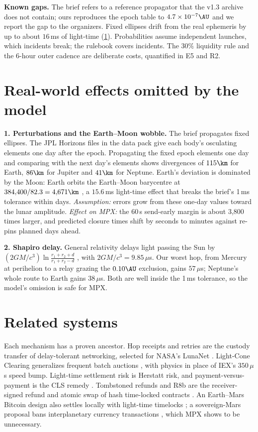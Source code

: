 \textbf{Known gaps.} The brief refers to a reference propagator that the v1.3 archive does not contain; ours reproduces the epoch table to $4.7\times10^{-7}\AU$ and we report the gap to the organizers. Fixed ellipses drift from the real ephemeris by up to about $16$\,ms of light-time (\cref{sec:effects}). Probabilities assume independent launches, which incidents break; the rulebook covers incidents. The $30\%$ liquidity rule and the 6-hour outer cadence are deliberate costs, quantified in E5 and R2.

\section{Real-world effects omitted by the model}\label{sec:effects}
\textbf{1. Perturbations and the Earth--Moon wobble.} The brief propagates fixed ellipses. The JPL Horizons files in the data pack \cite{horizons} give each body's osculating elements one day after the epoch. Propagating the fixed epoch elements one day and comparing with the next day's elements shows divergences of $115\km$ for Earth, $86\km$ for Jupiter and $41\km$ for Neptune. Earth's deviation is dominated by the Moon: Earth orbits the Earth--Moon barycentre at $384{,}400/82.3 = 4{,}671\km$ \cite{folkner2009}, a $15.6$\,ms light-time effect that breaks the brief's 1\,ms tolerance within days. \emph{Assumption:} errors grow from these one-day values toward the lunar amplitude. \emph{Effect on MPX:} the 60\,s send-early margin is about 3{,}800 times larger, and predicted closure times shift by seconds to minutes against re-pins planned days ahead.

\textbf{2. Shapiro delay.} General relativity delays light passing the Sun by $(2GM/c^3)\ln\frac{r_1+r_2+d}{r_1+r_2-d}$ \cite{shapiro1964}, with $2GM/c^3=9.85\,\mu$s. Our worst hop, from Mercury at perihelion to a relay grazing the $0.10\AU$ exclusion, gains $57\,\mu$s; Neptune's whole route to Earth gains $38\,\mu$s. Both are well inside the 1\,ms tolerance, so the model's omission is safe for MPX.

\section{Related systems}\label{sec:related}
Each mechanism has a proven ancestor. Hop receipts and retries are the custody transfer of delay-tolerant networking, selected for NASA's LunaNet \cite{cerf,rfc9171}. Light-Cone Clearing generalizes frequent batch auctions \cite{budish2015}, with physics in place of IEX's $350\,\mu$s speed bump. Light-time settlement risk is Herstatt risk, and payment-versus-payment is the CLS remedy \cite{bisfx}. Tombstoned refunds and R8b are the receiver-signed refund and atomic swap of hash time-locked contracts \cite{htlc}. An Earth--Mars Bitcoin design also settles locally with light-time timelocks \cite{puente}; a sovereign-Mars proposal bans interplanetary currency transactions \cite{haqq}, which MPX shows to be unnecessary.

